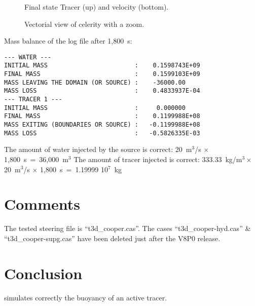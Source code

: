 \begin{figure}[H]
 \centering
{}
 \caption{Final state Tracer (up) and velocity (bottom).}\label{fig:Cooper:final}
\end{figure}

\begin{figure}[H]
 \centering
{}
 \caption{Vectorial view of celerity with a zoom.}\label{fig:Cooper:finalal}
\end{figure}

Mass balance of the log file after 1,800~s:
\begin{lstlisting}[language=TelFortran]
--- WATER ---
INITIAL MASS                        :    0.1598743E+09
FINAL MASS                          :    0.1599103E+09
MASS LEAVING THE DOMAIN (OR SOURCE) :    -36000.00    
MASS LOSS                           :    0.4833937E-04
--- TRACER 1 ---
INITIAL MASS                        :     0.000000    
FINAL MASS                          :    0.1199988E+08
MASS EXITING (BOUNDARIES OR SOURCE) :   -0.1199988E+08
MASS LOSS                           :   -0.5826335E-03
\end{lstlisting}

The amount of water injected by the source is correct: 20~m$^3$/s $\times$ 1,800~s~=~36,000~m$^3$
The amount of tracer injected is correct:
333.33~kg/m$^3 \times $20~m$^3$/s $\times$ 1,800~s~=~1.19999 10$^7$~kg

\section{Comments}

The tested steering file is “t3d\_cooper.cas”.
The cases “t3d\_cooper-hyd.cas” \& “t3d\_cooper-supg.cas” have been deleted
just after the V8P0 release.

\section{Conclusion}

 simulates correctly the buoyancy of an active tracer.
